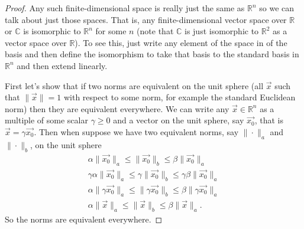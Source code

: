\documentclass[12pt]{article}
\theoremstyle{theorem}
\theoremstyle{definition}
\begin{document}
\begin{proof}
Any such finite-dimensional space is really just the same as ${\mathbb{R}}^n$ so
we can talk about just those spaces.  That is, any finite-dimensional vector
space over ${\mathbb{R}}$ or ${\mathbb{C}}$ is isomorphic to ${\mathbb{R}}^n$
for some $n$ (note that ${\mathbb{C}}$ is just isomorphic to ${\mathbb{R}}^2$
as a vector space over ${\mathbb{R}}$).
To see this, just write any element of the space in  of
the basis and then define the isomorphism to take that basis to the standard
basis in ${\mathbb{R}}^n$ and then extend linearly.

First let's show that if two norms are equivalent on the unit sphere
(all $\vec{x}$ such that $\|\vec{x}\|=1$ with respect to some  norm,
for example the standard Euclidean norm) then they are equivalent everywhere.
We can write any $\vec{x} \in {\mathbb{R}}^n$ as a multiple of some scalar
$\gamma \geq 0$ and a vector on the unit sphere, say $\vec{x_0}$, that is
$\vec{x} = \gamma \vec{x_0}$.
Then when suppose we have two equivalent
norms, say $\|\cdot\|_a$ and $\|\cdot\|_b$, on the unit sphere
\begin{gather*}
 \alpha \|\vec{x_0}\|_a
  \leq
 \|\vec{x_0}\|_b
  \leq
 \beta \|\vec{x_0}\|_a
\\
 \gamma \alpha \|\vec{x_0}\|_a
  \leq
 \gamma \|\vec{x_0}\|_b
  \leq
 \gamma \beta \|\vec{x_0}\|_a
\\
 \alpha \|\gamma \vec{x_0}\|_a
  \leq
 \|\gamma \vec{x_0}\|_b
  \leq
 \beta \|\gamma \vec{x_0}\|_a
\\
 \alpha \|\vec{x}\|_a
  \leq
 \|\vec{x}\|_b
  \leq
 \beta \|\vec{x}\|_a .
\end{gather*}
So the norms are equivalent everywhere.


\end{proof}
\end{document}
